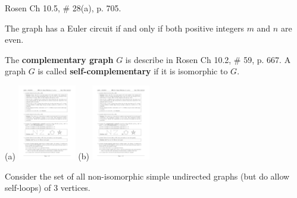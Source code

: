 \begin{questions}
\bonusquestion[1] Rosen Ch 10.5, \# 28(a), p. 705.
    \ifprintanswers
        \vspace{-10pt}
    \fi
    \begin{solution}
        The graph has a Euler circuit if and only if both positive integers $m$ and $n$ are even.
    \end{solution}



\bonusquestion[3] The \textbf{complementary graph} $G$ is describe in Rosen Ch 10.2, \# 59, p. 667. A graph $G$ is called \textbf{self-complementary} if it is isomorphic to $G$.
    \ifprintanswers
        \vspace{-10pt}
    \fi
    \begin{solution}
        (a) \includegraphics[width=1in]{figs/hw12-bp1a.pdf} \hspace{0.25in} (b) \includegraphics[width=1in]{figs/hw12-bp1b.pdf}
    \end{solution}




\bonusquestion[10]  Consider the set of all non-isomorphic simple undirected graphs (but do allow self-loops) of 3 vertices.  %


\end{questions}
